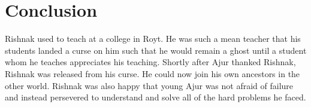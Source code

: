 \chapter{Conclusion}
Rishnak used to teach at a college in Royt. He was such a mean teacher that his students landed a curse on him such that he would remain a ghost until a student whom he teaches appreciates his teaching. Shortly after Ajur thanked Rishnak, Rishnak was released from his curse. He could now join his own ancestors in the other world. Rishnak was also happy that young Ajur was not afraid of failure and instead persevered to understand and solve all of the hard problems he faced.
